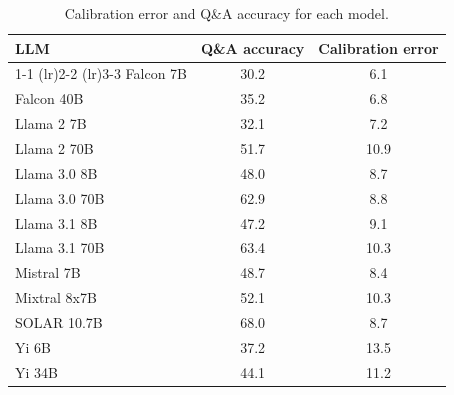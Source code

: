 \begin{table}[h]
\caption{Calibration error and Q\&A accuracy for each model.}
\label{tab:calibration_prob_max}
\centering
\begin{tabular}{lcc}
\toprule
LLM & Q\&A accuracy & Calibration error \\ 
\cmidrule(lr){1-1} \cmidrule(lr){2-2} \cmidrule(lr){3-3}
Falcon 7B & 30.2 & 6.1\\
Falcon 40B & 35.2 & 6.8\\
Llama 2 7B & 32.1 & 7.2\\
Llama 2 70B & 51.7 & 10.9\\
Llama 3.0 8B & 48.0 & 8.7\\
Llama 3.0 70B & 62.9 & 8.8\\
Llama 3.1 8B & 47.2 & 9.1\\
Llama 3.1 70B & 63.4 & 10.3\\
Mistral 7B & 48.7 & 8.4\\
Mixtral 8x7B & 52.1 & 10.3\\
SOLAR 10.7B & 68.0 & 8.7\\
Yi 6B & 37.2 & 13.5\\
Yi 34B & 44.1 & 11.2\\
\bottomrule
\end{tabular}
\end{table}
